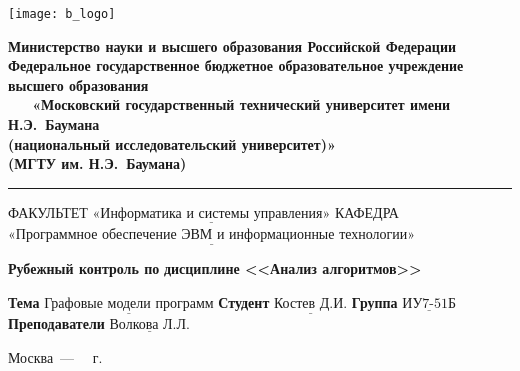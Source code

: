 \documentclass[12pt]{report}
\begin{document}
\thispagestyle{empty}
\begin{titlepage}
	\noindent \begin{minipage}{0.15\textwidth}
	\texttt{[image: b\_logo]}
	\end{minipage}
	\noindent\begin{minipage}{0.9\textwidth}\centering
		\textbf{Министерство науки и высшего образования Российской Федерации}\\
		\textbf{Федеральное государственное бюджетное образовательное учреждение высшего образования}\\
		\textbf{~~~«Московский государственный технический университет имени Н.Э.~Баумана}\\
		\textbf{(национальный исследовательский университет)»}\\
		\textbf{(МГТУ им. Н.Э.~Баумана)}
	\end{minipage}
	
	\noindent\rule{18cm}{3pt}
	\newline\newline
	\noindent ФАКУЛЬТЕТ $\underline{\text{«Информатика и системы управления»}}$ \newline\newline
	\noindent КАФЕДРА $\underline{\text{«Программное обеспечение ЭВМ и информационные технологии»}}$\newline\newline\newline\newline\newline
	
	
	\begin{center}
		\noindent\begin{minipage}{1.3\textwidth}\centering
			\Large\textbf{  Рубежный контроль по }\newline
			\textbf{ дисциплине <<Анализ алгоритмов>>}\newline\newline
		\end{minipage}
	\end{center}
	
	\noindent\textbf{Тема} $\underline{\text{Графовые модели программ}}$\newline\newline
	\noindent\textbf{Студент} $\underline{\text{Костев Д.И.}}$\newline\newline
	\noindent\textbf{Группа} $\underline{\text{ИУ7-51Б}}$\newline\newline
	\noindent\textbf{Преподаватели} $\underline{\text{Волкова Л.Л.}}$\newline\newline\newline
	
	\begin{center}
		\vfill
		Москва~---~\the\year
		~г.
	\end{center}
\end{titlepage}
\end{document}
